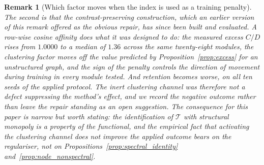 \documentclass[11pt,a4paper]{article}
\newtheorem{remark}{Remark}
\begin{document}
\begin{remark}[Which factor moves when the index is used as a training penalty]
The second is that the contrast-preserving construction, which an earlier
version of this remark offered as the obvious repair, has since been built and
evaluated. A row-wise cosine affinity does what it was designed to do: the
measured excess $C/D$ rises from $1.0000$ to a median of $1.36$ across the same
twenty-eight modules, the clustering factor moves off the value predicted by
Proposition~\ref{prop:excess} for an unstructured graph, and the sign of the
penalty controls the direction of movement during training in every module
tested. And retention becomes \emph{worse}, on all ten seeds of the applied
protocol. The inert clustering channel was therefore not a defect suppressing
the method's effect, and we record the negative outcome rather than leave the
repair standing as an open suggestion. The consequence for this paper is
narrow but worth stating: the identification of $\mathcal{T}$ with structural
monopoly is a property of the functional, and the empirical fact that
activating the clustering channel does not improve the applied outcome bears
on the regulariser, not on Propositions~\ref{prop:spectral_identity}
and~\ref{prop:node_nonspectral}.
\end{remark}
\end{document}
